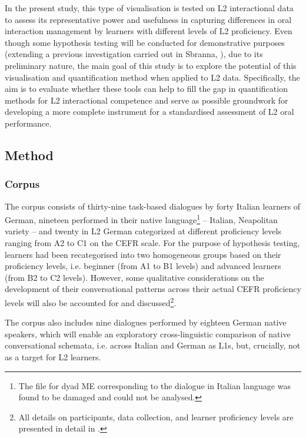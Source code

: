 In the present study, this type of visualisation is tested on L2 interactional data to assess its representative power and usefulness in capturing differences in oral interaction management by learners with different levels of L2 proficiency. Even though some hypothesis testing will be conducted for demonstrative purposes (extending a previous investigation carried out in Sbranna, \citealt{CangemiGrice2021}), due to its preliminary nature, the main goal of this study is to explore the potential of this visualisation and quantification method when applied to L2 data. Specifically, the aim is to evaluate whether these tools can help to fill the gap in quantification methods for L2 interactional competence and serve as possible groundwork for developing a more complete instrument for a standardised assessment of L2 oral performance.

\subsection{Method}
\hypertarget{Toc191305929}{}\subsubsection{Corpus}
\hypertarget{Toc191305930}{}
The corpus consists of thirty-nine task-based dialogues by forty Italian learners of German, nineteen performed in their native language\footnote{The file for dyad ME corresponding to the dialogue in Italian language was found to be damaged and could not be analysed.} – Italian, Neapolitan variety – and twenty in L2 German categorized at different proficiency levels ranging from A2 to C1 on the CEFR scale. For the purpose of hypothesis testing, learners had been recategorised into two homogeneous groups based on their proficiency levels, i.e. beginner (from A1 to B1 levels) and advanced learners (from B2 to C2 levels). However, some qualitative considerations on the development of their conversational patterns across their actual CEFR proficiency levels will also be accounted for and discussed\footnote{All details on participants, data collection, and learner proficiency levels are presented in detail in .}. 

The corpus also includes nine dialogues performed by eighteen German native speakers, which will enable an exploratory cross-linguistic comparison of native conversational schemata, i.e. across Italian and German as L1s, but, crucially, not as a target for L2 learners. 

